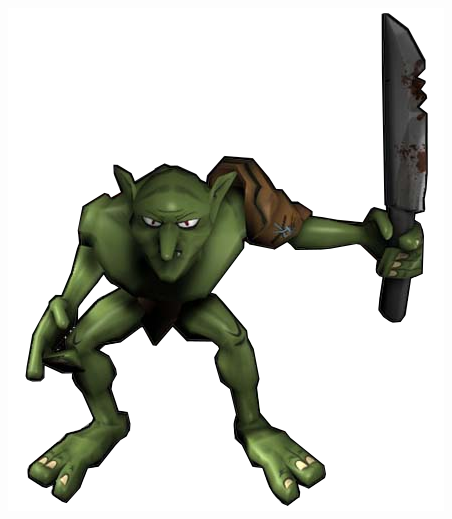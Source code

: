 \documentclass[green]{beamer}
\begin{document}
\begin{frame}
\begin{columns}[t]
	\begin{center}
	    \includegraphics[scale=0.3]{img/goblin.png}
	\end{center}
	
    \end{columns} 
\end{frame}
\end{document}
